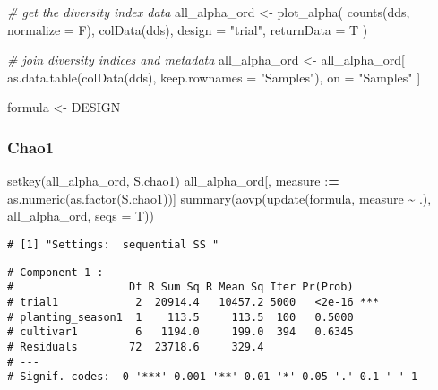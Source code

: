 \documentclass[
]{article}
\newenvironment{Shaded}{\begin{snugshade}}{\end{snugshade}}
\newcommand{\AttributeTok}[1]{\textcolor[rgb]{0.77,0.63,0.00}{#1}}
\newcommand{\CommentTok}[1]{\textcolor[rgb]{0.56,0.35,0.01}{\textit{#1}}}
\newcommand{\ErrorTok}[1]{\textcolor[rgb]{0.64,0.00,0.00}{\textbf{#1}}}
\newcommand{\FunctionTok}[1]{\textcolor[rgb]{0.00,0.00,0.00}{#1}}
\newcommand{\NormalTok}[1]{#1}
\newcommand{\OtherTok}[1]{\textcolor[rgb]{0.56,0.35,0.01}{#1}}
\newcommand{\SpecialCharTok}[1]{\textcolor[rgb]{0.00,0.00,0.00}{#1}}
\newcommand{\StringTok}[1]{\textcolor[rgb]{0.31,0.60,0.02}{#1}}
\begin{document}
\begin{Shaded}
\begin{Highlighting}[]
\CommentTok{\# get the diversity index data}
\NormalTok{all\_alpha\_ord }\OtherTok{\textless{}{-}} \FunctionTok{plot\_alpha}\NormalTok{(}
  \FunctionTok{counts}\NormalTok{(dds, }\AttributeTok{normalize =}\NormalTok{ F), }\FunctionTok{colData}\NormalTok{(dds), }\AttributeTok{design =} \StringTok{"trial"}\NormalTok{, }\AttributeTok{returnData =}\NormalTok{ T}
\NormalTok{)}

\CommentTok{\# join diversity indices and metadata}
\NormalTok{all\_alpha\_ord }\OtherTok{\textless{}{-}}\NormalTok{ all\_alpha\_ord[}
  \FunctionTok{as.data.table}\NormalTok{(}\FunctionTok{colData}\NormalTok{(dds), }\AttributeTok{keep.rownames =} \StringTok{"Samples"}\NormalTok{), on }\OtherTok{=} \StringTok{"Samples"}
\NormalTok{]}

\NormalTok{formula }\OtherTok{\textless{}{-}}\NormalTok{ DESIGN}
\end{Highlighting}
\end{Shaded}

\hypertarget{chao1-1}{%
\subsubsection{Chao1}\label{chao1-1}}

\begin{Shaded}
\begin{Highlighting}[]
\FunctionTok{setkey}\NormalTok{(all\_alpha\_ord, S.chao1)}
\NormalTok{all\_alpha\_ord[, measure }\SpecialCharTok{:}\ErrorTok{=} \FunctionTok{as.numeric}\NormalTok{(}\FunctionTok{as.factor}\NormalTok{(S.chao1))]}
\FunctionTok{summary}\NormalTok{(}\FunctionTok{aovp}\NormalTok{(}\FunctionTok{update}\NormalTok{(formula, measure }\SpecialCharTok{\textasciitilde{}}\NormalTok{ .), all\_alpha\_ord, }\AttributeTok{seqs =}\NormalTok{ T))}
\end{Highlighting}
\end{Shaded}

\begin{verbatim}
# [1] "Settings:  sequential SS "
\end{verbatim}

\begin{verbatim}
# Component 1 :
#                  Df R Sum Sq R Mean Sq Iter Pr(Prob)    
# trial1            2  20914.4   10457.2 5000   <2e-16 ***
# planting_season1  1    113.5     113.5  100   0.5000    
# cultivar1         6   1194.0     199.0  394   0.6345    
# Residuals        72  23718.6     329.4                  
# ---
# Signif. codes:  0 '***' 0.001 '**' 0.01 '*' 0.05 '.' 0.1 ' ' 1
\end{verbatim}
\end{document}
